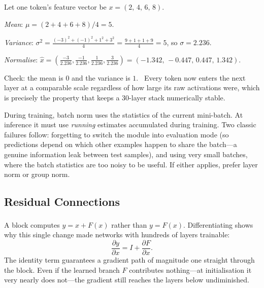 \begin{workedexample}
Let one token's feature vector be $x = (2,\,4,\,6,\,8)$.

\emph{Mean}: $\mu = (2+4+6+8)/4 = 5$.

\emph{Variance}: $\sigma^2 = \frac{(-3)^2+(-1)^2+1^2+3^2}{4}
= \frac{9+1+1+9}{4} = 5$, so $\sigma = 2.236$.

\emph{Normalise}: $\hat x = \left(\frac{-3}{2.236},\frac{-1}{2.236},
\frac{1}{2.236},\frac{3}{2.236}\right) = (-1.342,\,-0.447,\,0.447,\,1.342)$.

Check: the mean is $0$ and the variance is $1$. \checkmark\ Every token now
enters the next layer at a comparable scale regardless of how large its raw
activations were, which is precisely the property that keeps a $30$-layer stack
numerically stable.
\end{workedexample}

\begin{cautionbox}
During training, batch norm uses the statistics of the current mini-batch. At
inference it must use \emph{running} estimates accumulated during training. Two
classic failures follow: forgetting to switch the module into evaluation mode
(so predictions depend on which other examples happen to share the batch---a
genuine information leak between test samples), and using very small batches,
where the batch statistics are too noisy to be useful. If either applies,
prefer layer norm or group norm.
\end{cautionbox}

\subsection{Residual Connections}

A  block computes $y = x + F(x)$ rather than $y =
F(x)$\textsuperscript{\cite{heDeepResidualLearning2016}}. Differentiating shows
why this single change made networks with hundreds of layers trainable:
\begin{equation}
  \frac{\partial y}{\partial x} = I + \frac{\partial F}{\partial x}.
  \label{eq:dl-residual}
\end{equation}
The identity term guarantees a gradient path of magnitude one straight through
the block. Even if the learned branch $F$ contributes nothing---at
initialisation it very nearly does not---the gradient still reaches the layers
below undiminished.

